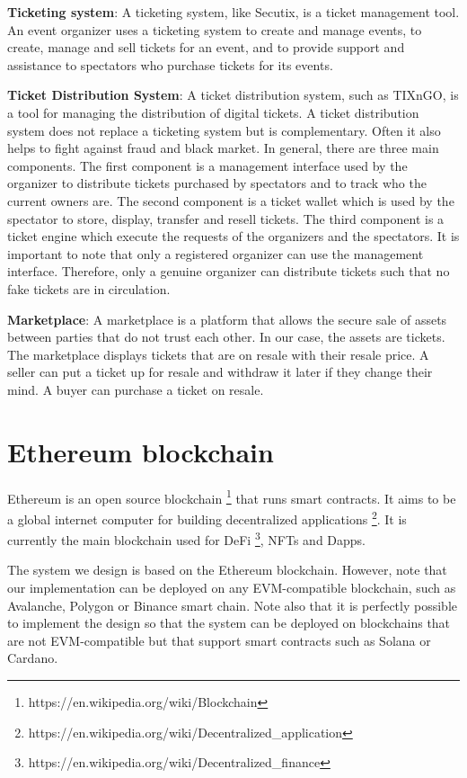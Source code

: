 \documentclass[a4paper,11pt,oneside]{report}
\begin{document}
\begin{description}
    \item \textbf{Ticketing system}: A ticketing system, like Secutix, is a ticket management tool. An event organizer uses a ticketing system to create and manage events, to create, manage and sell tickets for an event, and to provide support and assistance to spectators who purchase tickets for its events.
    \item \textbf{Ticket Distribution System}: A ticket distribution system, such as TIXnGO, is a tool for managing the distribution of digital tickets. A ticket distribution system does not replace a ticketing system but is complementary. Often it also helps to fight against fraud and black market. In general, there are three main components. The first component is a management interface used by the organizer to distribute tickets purchased by spectators and to track who the current owners are. The second component is a ticket wallet which is used by the spectator to store, display, transfer and resell tickets. The third component is a ticket engine which execute the requests of the organizers and the spectators. It is important to note that only a registered organizer can use the management interface. Therefore, only a genuine organizer can distribute tickets such that no fake tickets are in circulation.
    \item \textbf{Marketplace}: A marketplace is a platform that allows the secure sale of assets between parties that do not trust each other. In our case, the assets are tickets. The marketplace displays tickets that are on resale with their resale price. A seller can put a ticket up for resale and withdraw it later if they change their mind. A buyer can purchase a ticket on resale.
\end{description}

\section{Ethereum blockchain}
Ethereum is an open source blockchain \footnote{https://en.wikipedia.org/wiki/Blockchain} that runs smart contracts. It aims to be a global internet computer for building decentralized applications \footnote{https://en.wikipedia.org/wiki/Decentralized\_application}. It is currently the main blockchain used for DeFi \footnote{https://en.wikipedia.org/wiki/Decentralized\_finance}, NFTs and Dapps.

The system we design is based on the Ethereum blockchain. However, note that our implementation can be deployed on any EVM-compatible blockchain, such as Avalanche, Polygon or Binance smart chain. Note also that it is perfectly possible to implement the design so that the system can be deployed on blockchains that are not EVM-compatible but that support smart contracts such as Solana or Cardano.
\end{document}
